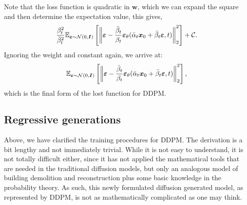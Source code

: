 Note that the loss function is quadratic in $\bm{w}$, which we can expand the square and then determine the expectation value, this gives,
\begin{equation}
    \label{eq:1.14}
    \frac{\beta_t^2}{\bar{\beta}_t^2}\mathbb{E}_{\bm{\varepsilon}\sim\mathcal{N}(0,\bm{I})}\left[\left\| \bm{\varepsilon}-\frac{\bar{\beta}_t}{\beta_t}\bm{\varepsilon}_\theta (\bar{\alpha}_t\bm{x}_0+\bar{\beta}_t\bm{\varepsilon},t)   \right\|_2^2 \right]+\mathcal{C}.
\end{equation}
Ignoring the weight and constant again, we arrive at:
\textcolor{red}{
\begin{equation}\label{eq:1.15}
    \mathbb{E}_{\bm{\varepsilon}\sim\mathcal{N}(0,\bm{I})}\left[\left\| \bm{\varepsilon}-\frac{\bar{\beta}_t}{\beta_t}\bm{\varepsilon}_\theta (\bar{\alpha}_t\bm{x}_0+\bar{\beta}_t\bm{\varepsilon},t)   \right\|_2^2 \right],
\end{equation}}
which is the final form of the lost function for DDPM.

\subsection{Regressive generations}
Above, we have clarified the training procedures for DDPM. The derivation is a bit lengthy and not immediately trivial. While it is not easy to understand, it is not totally difficult either, since it has not applied the mathematical tools that are needed in the traditional diffusion models, but only an analogous model of building demolition and reconstruction plus some basic knowledge in the probability theory. As such, this newly formulated diffusion generated model, as represented by DDPM, is not as mathematically complicated as one may think. 

